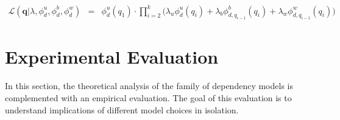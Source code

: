 \documentclass[]{article}
\begin{document}
\begin{eqnarray}
\mathcal{L}(\mathbf{q}|\lambda,\phi_{d}^{u},\phi_{d}^{b},\phi_{d}^{w}) & = & \phi_{d}^{u}(q_{1})\cdot\prod_{i=2}^{k}\biggl(\lambda_{u}\phi_{d}^{u}(q_{i}) +\lambda_{b}\phi_{d,q_{i-1}}^{b}(q_{i})+\lambda_{w}\phi_{d,q_{i-1}}^{w}(q_{i})\biggr)\label{eq:Likelihood-genNGram}
\end{eqnarray}


\section{Experimental Evaluation}

\label{sec:Experiments}In this section, the theoretical analysis
of the family of dependency models is complemented with an empirical
evaluation. The goal of this evaluation is to understand implications
of different model choices in isolation. 
\end{document}
